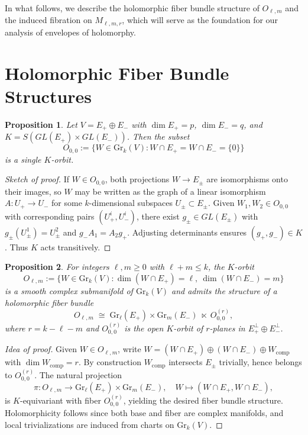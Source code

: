\documentclass[12pt,a4paper]{article}
\theoremstyle{plain}
\newtheorem{proposition}{Proposition}
\theoremstyle{definition}
\theoremstyle{remark}
\begin{document}
\medskip
In what follows, we describe the holomorphic fiber bundle structure of 
$O_{\ell,m}$ and the induced fibration on $M_{\ell,m,r}$, which will 
serve as the foundation for our analysis of envelopes of holomorphy.

\section{Holomorphic Fiber Bundle Structures}
\begin{proposition}
Let $V = E_+ \oplus E_-$ with $\dim E_+ = p$, $\dim E_- = q$, and 
$K = S(GL(E_+) \times GL(E_-))$. 
Then the subset
\[
O_{0,0} := \{ W \in \mathrm{Gr}_k(V) : W \cap E_+ = W \cap E_- = \{0\} \}
\]
is a single $K$-orbit. 
\end{proposition}

\begin{proof}[Sketch of proof]
If $W \in O_{0,0}$, both projections $W \to E_\pm$ are isomorphisms onto 
their images, so $W$ may be written as the graph of a linear isomorphism 
$A : U_+ \to U_-$ for some $k$-dimensional subspaces $U_\pm \subset E_\pm$. 
Given $W_1,W_2 \in O_{0,0}$ with corresponding pairs $(U_+^i,U_-^i)$, 
there exist $g_\pm \in GL(E_\pm)$ with $g_\pm(U_\pm^1)=U_\pm^2$ and 
$g_- A_1 = A_2 g_+$. 
Adjusting determinants ensures $(g_+,g_-) \in K$. 
Thus $K$ acts transitively. 
\end{proof}




\begin{proposition}
For integers $\ell,m \geq 0$ with $\ell+m \leq k$, the $K$-orbit
\[
O_{\ell,m} := \{ W \in \mathrm{Gr}_k(V) : 
\dim(W \cap E_+) = \ell, \ \dim(W \cap E_-) = m \}
\]
is a smooth complex submanifold of $\mathrm{Gr}_k(V)$ and admits the structure 
of a holomorphic fiber bundle
\[
O_{\ell,m} \;\cong\; \mathrm{Gr}_\ell(E_+) \times \mathrm{Gr}_m(E_-) 
\;\ltimes\; O^{(r)}_{0,0},
\]
where $r = k-\ell-m$ and $O^{(r)}_{0,0}$ is the open $K$-orbit of $r$-planes 
in $E_+^\perp \oplus E_-^\perp$. 
\end{proposition}

\begin{proof}[Idea of proof]
Given $W \in O_{\ell,m}$, write 
$W = (W \cap E_+) \oplus (W \cap E_-) \oplus W_{\mathrm{comp}}$ 
with $\dim W_{\mathrm{comp}} = r$. 
By construction $W_{\mathrm{comp}}$ intersects $E_\pm$ trivially, hence 
belongs to $O^{(r)}_{0,0}$. 
The natural projection
\[
\pi : O_{\ell,m} \to \mathrm{Gr}_\ell(E_+) \times \mathrm{Gr}_m(E_-), 
\quad W \mapsto (W \cap E_+, W \cap E_-),
\]
is $K$-equivariant with fiber $O^{(r)}_{0,0}$, yielding the desired 
fiber bundle structure. 
Holomorphicity follows since both base and fiber are complex manifolds, 
and local trivializations are induced from charts on $\mathrm{Gr}_k(V)$. 
\end{proof}
\end{document}
